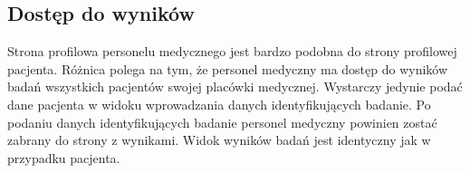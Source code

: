 \documentclass{documentation}
\begin{document}
\subsection{Dostęp do wyników}

Strona profilowa personelu medycznego jest bardzo podobna do strony profilowej pacjenta.
Różnica polega na tym, że personel medyczny ma dostęp do wyników badań wszystkich pacjentów swojej placówki medycznej.
Wystarczy jedynie podać dane pacjenta w widoku wprowadzania danych identyfikujących badanie.
Po podaniu danych identyfikujących badanie personel medyczny powinien zostać zabrany do strony z wynikami.
Widok wyników badań jest identyczny jak w przypadku pacjenta.
\end{document}
